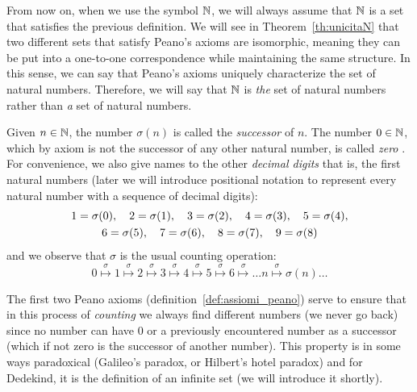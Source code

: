 From now on, when we use the symbol ${\mathbb N}$, we will always assume that ${\mathbb N}$ is a
set that satisfies the previous definition. We will see in
Theorem~\ref{th:unicitaN} that two different sets that satisfy Peano's axioms
are isomorphic, meaning they can be put into a one-to-one correspondence while
maintaining the same structure. In this sense, we can say that Peano's axioms
uniquely characterize the set of natural numbers. Therefore, we will say that
${\mathbb N}$ is \emph{the} set of natural numbers rather than \emph{a} set of natural
numbers.

Given $n\in {\mathbb N}$, the number $\sigma(n)$ is called the \emph{successor}%
%
 of $n$. 
The number $0\in {\mathbb N}$, which by axiom is not the successor of any other 
natural number, is called \emph{zero}%
%
. 
For convenience, we also give names to the other \emph{decimal digits}
%
%
that is, the first natural numbers
(later we will introduce positional notation to represent every natural number 
with a sequence of decimal digits):
\begin{equation}\label{eq:cifre}
\begin{gathered}
 1 = \sigma(0),\quad  
 2 = \sigma(1),\quad
 3 = \sigma(2),\quad 
 4 = \sigma(3),\quad
 5 = \sigma(4),\\ 
 6 = \sigma(5),\quad 
 7 = \sigma(6),\quad 
 8 = \sigma(7),\quad 
 9 = \sigma(8)
\end{gathered}
\end{equation}
and we observe that $\sigma$ is the usual counting operation:
 \[
 0 \stackrel\sigma\mapsto 1 \stackrel\sigma\mapsto 2 \stackrel\sigma\mapsto 
 3 \stackrel\sigma\mapsto 4 \stackrel\sigma\mapsto 5 \stackrel\sigma\mapsto 
 6 \stackrel\sigma\mapsto \dots  n \stackrel\sigma\mapsto \sigma(n) \dots
 \]

The first two Peano axioms (definition~\ref{def:assiomi_peano}) 
serve to ensure that in this process of \emph{counting}%
%
we always find different numbers (we never go back) since no number 
can have $0$ or a previously encountered number as a successor (which 
if not zero is the successor of another number).
This property is in some ways paradoxical
(Galileo's paradox, or Hilbert's hotel paradox)
%
%
%
%
and for Dedekind, it is the definition of an infinite set (we will introduce it
shortly).%
%

